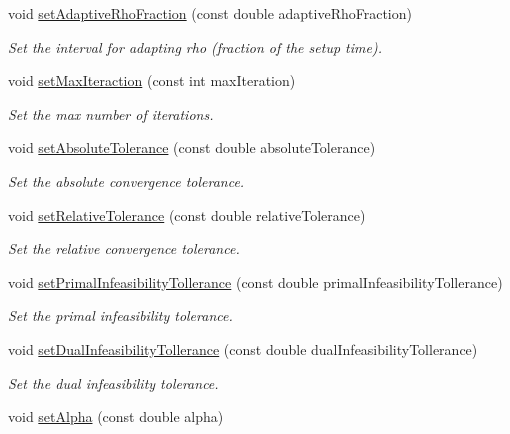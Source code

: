 \begin{DoxyCompactItemize}
void \hyperlink{classOsqpEigen_1_1Settings_a82bb52fd369ecfc177fbccc1d5e510d8}{set\+Adaptive\+Rho\+Fraction} (const double adaptive\+Rho\+Fraction)
\begin{DoxyCompactList}\small\item\em Set the interval for adapting rho (fraction of the setup time). \end{DoxyCompactList}\item 
void \hyperlink{classOsqpEigen_1_1Settings_ac670100dbf41f46a99122b58795038da}{set\+Max\+Iteraction} (const int max\+Iteration)
\begin{DoxyCompactList}\small\item\em Set the max number of iterations. \end{DoxyCompactList}\item 
void \hyperlink{classOsqpEigen_1_1Settings_a4498f6973031eadb2ad94b60dc856651}{set\+Absolute\+Tolerance} (const double absolute\+Tolerance)
\begin{DoxyCompactList}\small\item\em Set the absolute convergence tolerance. \end{DoxyCompactList}\item 
void \hyperlink{classOsqpEigen_1_1Settings_aabf457998cd2b4ba6c6e61036a04de1e}{set\+Relative\+Tolerance} (const double relative\+Tolerance)
\begin{DoxyCompactList}\small\item\em Set the relative convergence tolerance. \end{DoxyCompactList}\item 
void \hyperlink{classOsqpEigen_1_1Settings_aa56c63231442a3d6ebc2d78fccec2aab}{set\+Primal\+Infeasibility\+Tollerance} (const double primal\+Infeasibility\+Tollerance)
\begin{DoxyCompactList}\small\item\em Set the primal infeasibility tolerance. \end{DoxyCompactList}\item 
void \hyperlink{classOsqpEigen_1_1Settings_a466e7884ef5dfe331f4c1fdc3382d7bb}{set\+Dual\+Infeasibility\+Tollerance} (const double dual\+Infeasibility\+Tollerance)
\begin{DoxyCompactList}\small\item\em Set the dual infeasibility tolerance. \end{DoxyCompactList}\item 
void \hyperlink{classOsqpEigen_1_1Settings_a141f192237f68447ac898a222bb3c1c9}{set\+Alpha} (const double alpha)

\end{DoxyCompactItemize}
